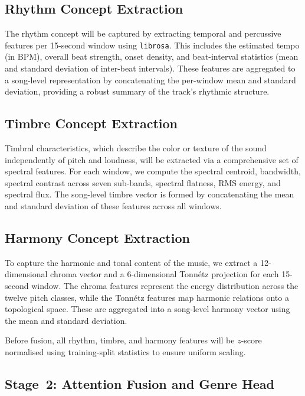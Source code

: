 \documentclass[sigconf,nonacm]{acmart}
\begin{document}
\subsection{Rhythm Concept Extraction}

The rhythm concept will be captured by extracting temporal and percussive features per 15-second window using \texttt{librosa}. This includes the estimated tempo (in BPM), overall beat strength, onset density, and beat-interval statistics (mean and standard deviation of inter-beat intervals). These features are aggregated to a song-level representation by concatenating the per-window mean and standard deviation, providing a robust summary of the track's rhythmic structure.

\subsection{Timbre Concept Extraction}

Timbral characteristics, which describe the color or texture of the sound independently of pitch and loudness, will be extracted via a comprehensive set of spectral features. For each window, we compute the spectral centroid, bandwidth, spectral contrast across seven sub-bands, spectral flatness, RMS energy, and spectral flux. The song-level timbre vector is formed by concatenating the mean and standard deviation of these features across all windows.

\subsection{Harmony Concept Extraction}

To capture the harmonic and tonal content of the music, we extract a 12-dimensional chroma vector and a 6-dimensional Tonn\'{e}tz projection for each 15-second window. The chroma features represent the energy distribution across the twelve pitch classes, while the Tonn\'{e}tz features map harmonic relations onto a topological space. These are aggregated into a song-level harmony vector using the mean and standard deviation.

Before fusion, all rhythm, timbre, and harmony features will be $z$-score normalised using training-split statistics to ensure uniform scaling.

\subsection{Stage~2: Attention Fusion and Genre Head}
\end{document}
